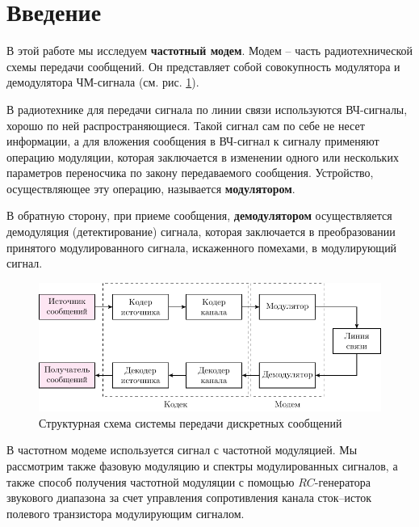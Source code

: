 \section*{Введение}


В этой работе мы исследуем \textbf{частотный модем}. Модем -- часть радиотехнической схемы передачи сообщений. Он представляет собой совокупность модулятора и демодулятора ЧМ-сигнала (см. рис. \ref{fig:2}). 

В радиотехнике для передачи сигнала по линии связи используются ВЧ-сигналы, хорошо по ней распространяющиеся. Такой сигнал сам по себе не несет информации, а для вложения сообщения в ВЧ-сигнал к сигналу применяют операцию модуляции, которая заключается в изменении одного или нескольких параметров переносчика по закону передаваемого сообщения. Устройство, осуществляющее эту операцию, называется \textbf{модулятором}.

В обратную сторону, при приеме сообщения, \textbf{демодулятором} осуществляется  демодуляция (детектирование) сигнала, которая заключается в преобразовании принятого модулированного сигнала, искаженного помехами, в модулирующий сигнал. 

\begin{figure}[H]
	\centering
	\includegraphics[scale=1]{plot/struct}
	\caption{Структурная схема системы передачи дискретных сообщений}
	\label{fig:2}
\end{figure} 

В частотном модеме используется сигнал с частотной модуляцией. Мы рассмотрим также фазовую модуляцию и спектры модулированных сигналов, а также способ получения частотной модуляции с помощью $RC$-генератора звукового диапазона за счет управления сопротивления канала сток--исток полевого транзистора модулирующим сигналом. 

